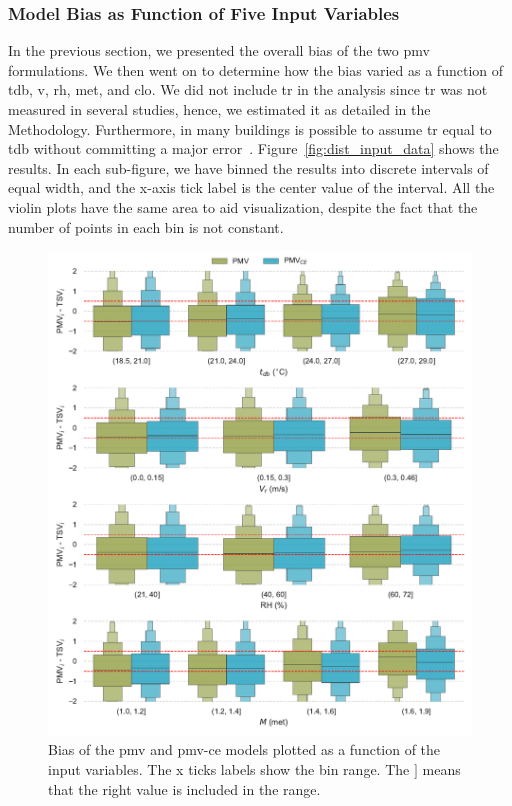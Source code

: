 \subsubsection{Model Bias as Function of Five Input Variables}\label{subsubsec:model-bias-variable}
In the previous section, we presented the overall bias of the two \ac{pmv} formulations.
We then went on to determine how the bias varied as a function of \ac{tdb}, \ac{v}, \ac{rh}, \ac{met}, and \ac{clo}.
We did not include \ac{tr} in the analysis since \ac{tr} was not measured in several studies, hence, we estimated it as detailed in the Methodology.
Furthermore, in many buildings is possible to assume \ac{tr} equal to \ac{tdb} without committing a major error~\cite{Dawe2020}.
Figure~\ref{fig:dist_input_data} shows the results.
In each sub-figure, we have binned the results into discrete intervals of equal width, and the x-axis tick label is the center value of the interval.
All the violin plots have the same area to aid visualization, despite the fact that the number of points in each bin is not constant.
\begin{figure}[htb!]
    \centering
    \includegraphics[width=\textwidth]{figures/bias_models}
    \caption{Bias of the \ac{pmv} and \ac{pmv-ce} models plotted as a function of the input variables.
    The x ticks labels show the bin range.
    The $]$ means that the right value is included in the range.
    }
    \label{fig:bias_models}
\end{figure}
